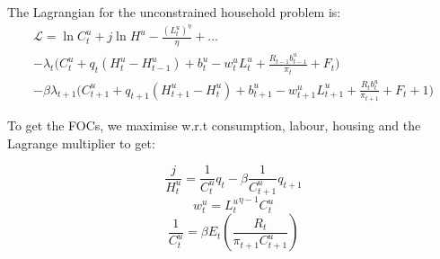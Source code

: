 \documentclass[11pt, a4paper]{article}
\begin{document}
The Lagrangian for the unconstrained household problem is:
\begin{equation}
\begin{aligned}
  \mathcal{L} = \ln C^u_t + j  \ln H^u - \frac{\left(L_{t}^{u}\right)^{\eta}}{\eta} + \dots \\
  - \lambda_t \bigg(C_{t}^{u}+q_{t}\left(H_{t}^{u}-H_{t-1}^{u}\right)+b_{t}^{u} - w_{t}^{u} L_{t}^{u}+\frac{R_{t-1} b_{t-1}^{u}}{\pi_{t}}+F_{t}\bigg)  \\- \beta \lambda_{t+1} \bigg(C_{t+1}^{u}+q_{t+1}\left(H_{t+1}^{u}-H_{t}^{u}\right)+b_{t+1}^{u} - w_{t+1}^{u} L_{t+1}^{u}+\frac{R_{t} b_{t}^{u}}{\pi_{t+1}}+F_{t}+1\bigg)
  \end{aligned}
\end{equation}

To get the FOCs, we maximise w.r.t consumption, labour, housing and the Lagrange multiplier to get: 

\begin{equation}
  \frac{j}{H^{u}_t} = \frac{1}{C^{u}_{t}} q_t - \beta \frac{1}{C^{u}_{t+1}} q_{t+1}
\end{equation}
\begin{equation}
  w_t^u = {L_t^{u}}^{\eta -1} C^u_t
\end{equation}
\begin{equation}
\frac{1}{C_{t}^{u}}=\beta E_{t}\left(\frac{R_{t}}{\pi_{t+1} C_{t+1}^{u}}\right)
\end{equation}
\end{document}
